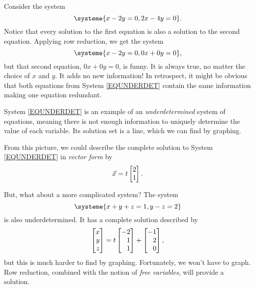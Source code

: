 	Consider the system
	\begin{equation}
		\label{EQUNDERDET}
		\systeme{x-2y=0,2x-4y=0}.
	\end{equation}
	Notice that every solution to the first equation is also a solution to the second equation.
	Applying row reduction, we get the system
	\[
		\systeme{x-2y=0,0x+0y=0},
	\]
	but that second equation, $0x+0y=0$, is funny. It is always true, no matter the choice of $x$ and $y$.
	It adds no new information! In retrospect, it might be obvious that both equations from System \eqref{EQUNDERDET}
	contain the same information making one equation redundant.

	System \eqref{EQUNDERDET} is an example of an \emph{underdetermined} system of equations, meaning 
	there is not enough information to uniquely determine the value of each variable.
	Its solution
	set is a line, which we can find by graphing.
	
	\begin{center}
	\end{center}

	From this picture, we could describe the complete solution to System \eqref{EQUNDERDET} in \emph{vector form} by
	\[
		\vec x = t\mat{2\\1}.
	\]

	But, what about a more complicated system? The system
	\[
		\systeme{x+y+z=1,y-z=2}
	\]
	is also underdetermined. It has a complete solution described by
	\[
		\mat{x\\y\\z} =t\mat{-2\\1\\1} + \mat{-1\\2\\0},
	\]
	but this is much harder to find by graphing.
	Fortunately, we won't have to graph. Row reduction, combined with the notion of \emph{free variables},
	will provide a solution.

